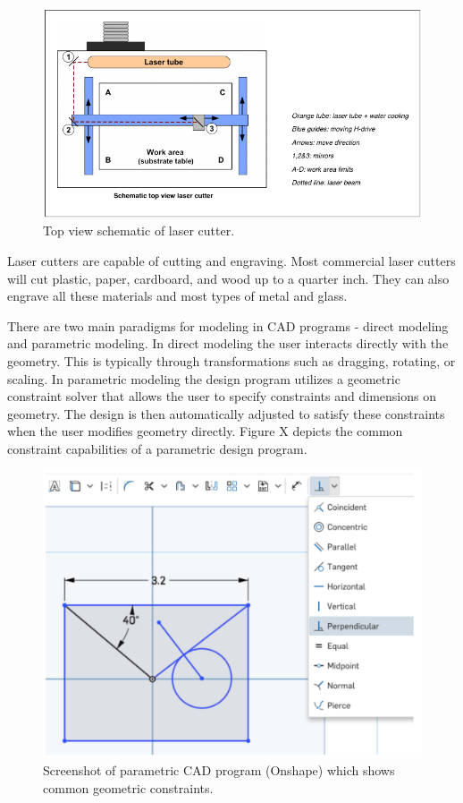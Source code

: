 \begin{figure}[H]
  \includegraphics[width=\linewidth]{lasersystem.jpg}
  \caption{Top view schematic of laser cutter.}
  \label{fig:lasersystem}
\end{figure}

Laser cutters are capable of cutting and engraving. Most commercial laser cutters will cut plastic, paper, cardboard, and wood up to a quarter inch. They can also engrave all these materials and most types of metal and glass.

There are two main paradigms for modeling in CAD programs - direct modeling and parametric modeling. In direct modeling the user interacts directly with the geometry. This is typically through transformations such as dragging, rotating, or scaling. In parametric modeling the design program utilizes a geometric constraint solver that allows the user to specify constraints and dimensions on geometry. The design is then automatically adjusted to satisfy these constraints when the user modifies geometry directly. Figure X depicts the common constraint capabilities of a parametric design program.

\begin{figure}[H]
  \includegraphics[width=\linewidth]{parametricProgram.jpg}
  \caption{Screenshot of parametric CAD program (Onshape) which shows common geometric constraints.}
  \label{fig:parametricProgram}
\end{figure}

